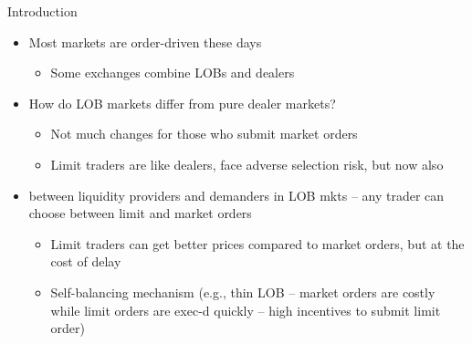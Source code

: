 \documentclass[english,10pt
,aspectratio=169
]{beamer}
\begin{document}
\begin{frame}{Introduction}
	\begin{itemize}
		\item Most markets are order-driven these days
		\begin{itemize}
			\item Some exchanges combine LOBs and dealers
		\end{itemize}
		\item How do \alert{LOB markets} differ from pure \alert{dealer markets}?
		\begin{itemize}
			\item Not much changes for those who submit market orders
			\item Limit traders are like dealers, face adverse selection risk, but now also 
		\end{itemize}
		\item {} between liquidity providers and demanders in LOB mkts -- any trader can choose between limit and market orders
		\begin{itemize}
			\item Limit traders can get better prices compared to market orders, but at the cost of delay
			\item Self-balancing mechanism (e.g., thin LOB -- market orders are costly while limit orders are exec-d quickly -- high incentives to submit limit order)
		\end{itemize}
	\end{itemize}
\end{frame}
\end{document}

